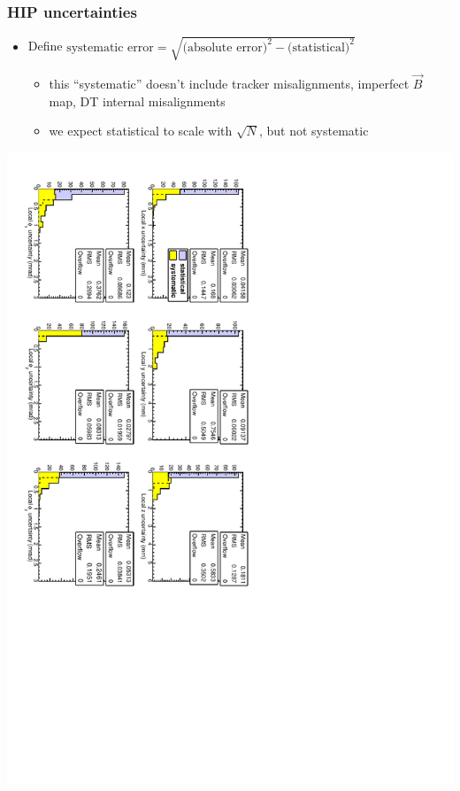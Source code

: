 \documentclass[compress]{beamer}
\begin{document}
\begin{frame}
\frametitle{HIP uncertainties}

\begin{itemize}
\item Define $\mbox{systematic error} = \sqrt{\mbox{(absolute error)}^2 - \mbox{(statistical)}^2}$
\begin{itemize}\setlength{\itemsep}{0.1 cm}
\item this ``systematic'' doesn't include tracker misalignments, imperfect $\vec{B}$ map, DT internal misalignments
\item we expect statistical to scale with $\sqrt{N}$, but not systematic
\end{itemize}
\end{itemize}

\vfill
\includegraphics[height=\linewidth, angle=90]{hip_MCuncertainties.pdf}
\end{frame}
\end{document}
